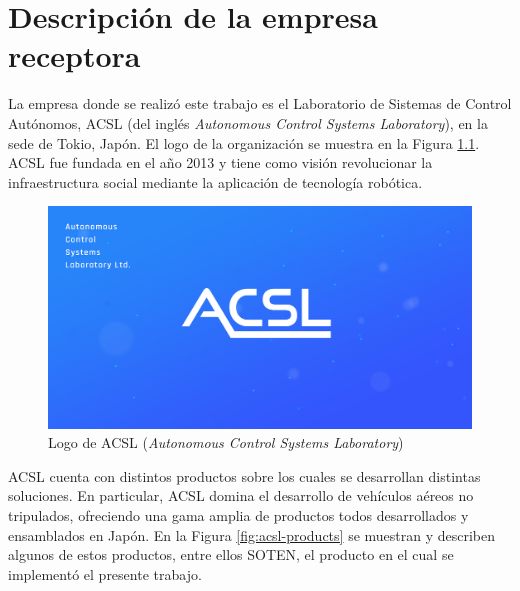 \chapter{Descripción de la empresa receptora}
\label{capitulo2}

La empresa donde se realizó este trabajo es el Laboratorio de Sistemas de Control Autónomos, ACSL (del inglés \textit{Autonomous Control Systems Laboratory}), en la sede de Tokio, Japón. El logo de la organización se muestra en la Figura \ref{fig:acsl-logo}. ACSL fue fundada en el año 2013 y tiene como visión revolucionar la infraestructura social mediante la aplicación de tecnología robótica.

\begin{figure}[H]
    \centering
    \includegraphics[scale=0.25]{partes/img/logo-acsl.jpg}
    \caption[Logo de ACSL (\textit{Autonomous Control Systems Laboratory})]{Logo de ACSL (\textit{Autonomous Control Systems Laboratory})}
    \label{fig:acsl-logo}
\end{figure}

ACSL cuenta con distintos productos sobre los cuales se desarrollan distintas soluciones. En particular, ACSL domina el desarrollo de vehículos aéreos no tripulados, ofreciendo una gama amplia de productos todos desarrollados y ensamblados en Japón. En la Figura \ref{fig:acsl-products} se muestran y describen algunos de estos productos, entre ellos SOTEN, el producto en el cual se implementó el presente trabajo.

